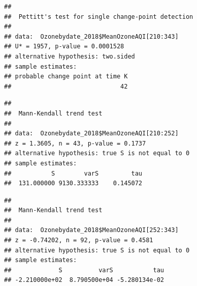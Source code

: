 \documentclass[12pt,]{article}
\newenvironment{Shaded}{\begin{snugshade}}{\end{snugshade}}
\newcommand{\KeywordTok}[1]{\textcolor[rgb]{0.13,0.29,0.53}{\textbf{#1}}}
\newcommand{\DecValTok}[1]{\textcolor[rgb]{0.00,0.00,0.81}{#1}}
\newcommand{\CommentTok}[1]{\textcolor[rgb]{0.56,0.35,0.01}{\textit{#1}}}
\newcommand{\OperatorTok}[1]{\textcolor[rgb]{0.81,0.36,0.00}{\textbf{#1}}}
\newcommand{\NormalTok}[1]{#1}
\begin{document}
\begin{Shaded}
\end{Shaded}

\begin{verbatim}
## 
##  Pettitt's test for single change-point detection
## 
## data:  Ozonebydate_2018$MeanOzoneAQI[210:343]
## U* = 1957, p-value = 0.0001528
## alternative hypothesis: two.sided
## sample estimates:
## probable change point at time K 
##                              42
\end{verbatim}

\begin{Shaded}
\end{Shaded}

\begin{verbatim}
## 
##  Mann-Kendall trend test
## 
## data:  Ozonebydate_2018$MeanOzoneAQI[210:252]
## z = 1.3605, n = 43, p-value = 0.1737
## alternative hypothesis: true S is not equal to 0
## sample estimates:
##           S        varS         tau 
##  131.000000 9130.333333    0.145072
\end{verbatim}

\begin{Shaded}
\end{Shaded}

\begin{verbatim}
## 
##  Mann-Kendall trend test
## 
## data:  Ozonebydate_2018$MeanOzoneAQI[252:343]
## z = -0.74202, n = 92, p-value = 0.4581
## alternative hypothesis: true S is not equal to 0
## sample estimates:
##             S          varS           tau 
## -2.210000e+02  8.790500e+04 -5.280134e-02
\end{verbatim}
\end{document}
